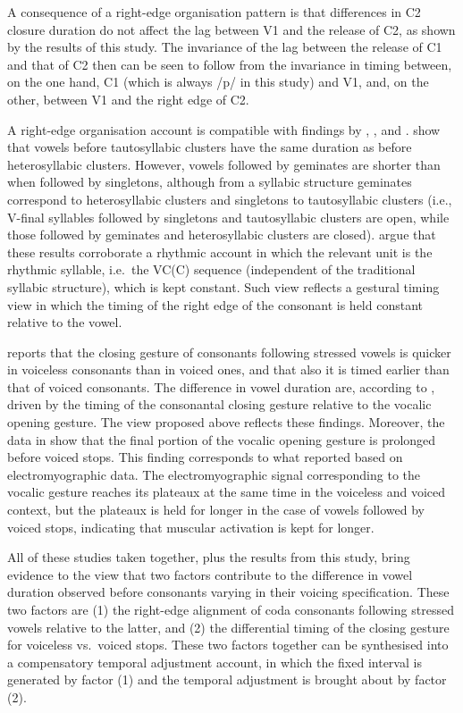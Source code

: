 \documentclass[]{JASAnew}
\begin{document}
A consequence of a right-edge organisation pattern is that differences
in C2 closure duration do not affect the lag between V1 and the release
of C2, as shown by the results of this study. The invariance of the lag
between the release of C1 and that of C2 then can be seen to follow from
the invariance in timing between, on the one hand, C1 (which is always
/p/ in this study) and V1, and, on the other, between V1 and the right
edge of C2.

A right-edge organisation account is compatible with findings by
\citet{raphael1975}, \citet{de-jong1991}, and \citet{celata2018}.
\citet{celata2018} show that vowels before tautosyllabic clusters have
the same duration as before heterosyllabic clusters. However, vowels
followed by geminates are shorter than when followed by singletons,
although from a syllabic structure geminates correspond to
heterosyllabic clusters and singletons to tautosyllabic clusters (i.e.,
V-final syllables followed by singletons and tautosyllabic clusters are
open, while those followed by geminates and heterosyllabic clusters are
closed). \citet{celata2018} argue that these results corroborate a
rhythmic account in which the relevant unit is the rhythmic syllable,
i.e.~the VC(C) sequence (independent of the traditional syllabic
structure), which is kept constant. Such view reflects a gestural timing
view in which the timing of the right edge of the consonant is held
constant relative to the vowel.

\citet{de-jong1991} reports that the closing gesture of consonants
following stressed vowels is quicker in voiceless consonants than in
voiced ones, and that also it is timed earlier than that of voiced
consonants. The difference in vowel duration are, according to
\citet{de-jong1991}, driven by the timing of the consonantal closing
gesture relative to the vocalic opening gesture. The view proposed above
reflects these findings. Moreover, the data in \citet{de-jong1991} show
that the final portion of the vocalic opening gesture is prolonged
before voiced stops. This finding corresponds to what
\citet{raphael1975} reported based on electromyographic data. The
electromyographic signal corresponding to the vocalic gesture reaches
its plateaux at the same time in the voiceless and voiced context, but
the plateaux is held for longer in the case of vowels followed by voiced
stops, indicating that muscular activation is kept for longer.

All of these studies taken together, plus the results from this study,
bring evidence to the view that two factors contribute to the difference
in vowel duration observed before consonants varying in their voicing
specification. These two factors are (1) the right-edge alignment of
coda consonants following stressed vowels relative to the latter, and
(2) the differential timing of the closing gesture for voiceless
vs.~voiced stops. These two factors together can be synthesised into a
compensatory temporal adjustment account, in which the fixed interval is
generated by factor (1) and the temporal adjustment is brought about by
factor (2).
\end{document}
